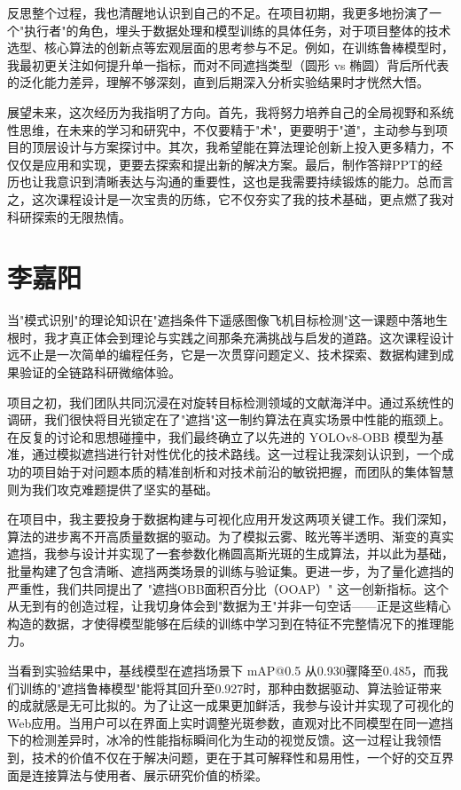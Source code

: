 \documentclass[12pt, a4paper]{report}
\begin{document}
反思整个过程，我也清醒地认识到自己的不足。在项目初期，我更多地扮演了一个"执行者"的角色，埋头于数据处理和模型训练的具体任务，对于项目整体的技术选型、核心算法的创新点等宏观层面的思考参与不足。例如，在训练鲁棒模型时，我最初更关注如何提升单一指标，而对不同遮挡类型（圆形 vs 椭圆）背后所代表的泛化能力差异，理解不够深刻，直到后期深入分析实验结果时才恍然大悟。

展望未来，这次经历为我指明了方向。首先，我将努力培养自己的全局视野和系统性思维，在未来的学习和研究中，不仅要精于"术"，更要明于"道"，主动参与到项目的顶层设计与方案探讨中。其次，我希望能在算法理论创新上投入更多精力，不仅仅是应用和实现，更要去探索和提出新的解决方案。最后，制作答辩PPT的经历也让我意识到清晰表达与沟通的重要性，这也是我需要持续锻炼的能力。总而言之，这次课程设计是一次宝贵的历练，它不仅夯实了我的技术基础，更点燃了我对科研探索的无限热情。

\vfill

\section{李嘉阳}
当"模式识别"的理论知识在"遮挡条件下遥感图像飞机目标检测"这一课题中落地生根时，我才真正体会到理论与实践之间那条充满挑战与启发的道路。这次课程设计远不止是一次简单的编程任务，它是一次贯穿问题定义、技术探索、数据构建到成果验证的全链路科研微缩体验。

项目之初，我们团队共同沉浸在对旋转目标检测领域的文献海洋中。通过系统性的调研，我们很快将目光锁定在了"遮挡"这一制约算法在真实场景中性能的瓶颈上。在反复的讨论和思想碰撞中，我们最终确立了以先进的 YOLOv8-OBB 模型为基准，通过模拟遮挡进行针对性优化的技术路线。这一过程让我深刻认识到，一个成功的项目始于对问题本质的精准剖析和对技术前沿的敏锐把握，而团队的集体智慧则为我们攻克难题提供了坚实的基础。

在项目中，我主要投身于数据构建与可视化应用开发这两项关键工作。我们深知，算法的进步离不开高质量数据的驱动。为了模拟云雾、眩光等半透明、渐变的真实遮挡，我参与设计并实现了一套参数化椭圆高斯光斑的生成算法，并以此为基础，批量构建了包含清晰、遮挡两类场景的训练与验证集。更进一步，为了量化遮挡的严重性，我们共同提出了 "遮挡OBB面积百分比（OOAP）" 这一创新指标。这个从无到有的创造过程，让我切身体会到"数据为王"并非一句空话——正是这些精心构造的数据，才使得模型能够在后续的训练中学习到在特征不完整情况下的推理能力。

当看到实验结果中，基线模型在遮挡场景下 mAP@0.5 从0.930骤降至0.485，而我们训练的"遮挡鲁棒模型"能将其回升至0.927时，那种由数据驱动、算法验证带来的成就感是无可比拟的。为了让这一成果更加鲜活，我参与设计并实现了可视化的Web应用。当用户可以在界面上实时调整光斑参数，直观对比不同模型在同一遮挡下的检测差异时，冰冷的性能指标瞬间化为生动的视觉反馈。这一过程让我领悟到，技术的价值不仅在于解决问题，更在于其可解释性和易用性，一个好的交互界面是连接算法与使用者、展示研究价值的桥梁。
\end{document}
